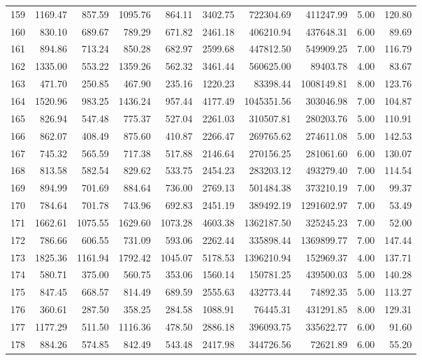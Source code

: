 \begin{tabular}{lrrrrrrrrr}
159 & 1169.47 & 857.59 & 1095.76 & 864.11 & 3402.75 & 722304.69 & 411247.99 & 5.00 & 120.80 \\
160 & 830.10 & 689.67 & 789.29 & 671.82 & 2461.18 & 406210.94 & 437648.31 & 6.00 & 89.69 \\
161 & 894.86 & 713.24 & 850.28 & 682.97 & 2599.68 & 447812.50 & 549909.25 & 7.00 & 116.79 \\
162 & 1335.00 & 553.22 & 1359.26 & 562.32 & 3461.44 & 560625.00 & 89403.78 & 4.00 & 83.67 \\
163 & 471.70 & 250.85 & 467.90 & 235.16 & 1220.23 & 83398.44 & 1008149.81 & 8.00 & 123.76 \\
164 & 1520.96 & 983.25 & 1436.24 & 957.44 & 4177.49 & 1045351.56 & 303046.98 & 7.00 & 104.87 \\
165 & 826.94 & 547.48 & 775.37 & 527.04 & 2261.03 & 310507.81 & 280203.76 & 5.00 & 110.91 \\
166 & 862.07 & 408.49 & 875.60 & 410.87 & 2266.47 & 269765.62 & 274611.08 & 5.00 & 142.53 \\
167 & 745.32 & 565.59 & 717.38 & 517.88 & 2146.64 & 270156.25 & 281061.60 & 6.00 & 130.07 \\
168 & 813.58 & 582.54 & 829.62 & 533.75 & 2454.23 & 283203.12 & 493279.40 & 7.00 & 114.54 \\
169 & 894.99 & 701.69 & 884.64 & 736.00 & 2769.13 & 501484.38 & 373210.19 & 7.00 & 99.37 \\
170 & 784.64 & 701.78 & 743.96 & 692.83 & 2451.19 & 389492.19 & 1291602.97 & 7.00 & 53.49 \\
171 & 1662.61 & 1075.55 & 1629.60 & 1073.28 & 4603.38 & 1362187.50 & 325245.23 & 7.00 & 52.00 \\
172 & 786.66 & 606.55 & 731.09 & 593.06 & 2262.44 & 335898.44 & 1369899.77 & 7.00 & 147.44 \\
173 & 1825.36 & 1161.94 & 1792.42 & 1045.07 & 5178.53 & 1396210.94 & 152969.37 & 4.00 & 137.71 \\
174 & 580.71 & 375.00 & 560.75 & 353.06 & 1560.14 & 150781.25 & 439500.03 & 5.00 & 140.28 \\
175 & 847.45 & 668.57 & 814.49 & 689.59 & 2555.63 & 432773.44 & 74892.35 & 5.00 & 113.27 \\
176 & 360.61 & 287.50 & 358.25 & 284.58 & 1088.91 & 76445.31 & 431291.85 & 8.00 & 129.31 \\
177 & 1177.29 & 511.50 & 1116.36 & 478.50 & 2886.18 & 396093.75 & 335622.77 & 6.00 & 91.60 \\
178 & 884.26 & 574.85 & 842.49 & 543.48 & 2417.98 & 344726.56 & 72621.89 & 6.00 & 55.20 \\

\end{tabular}
